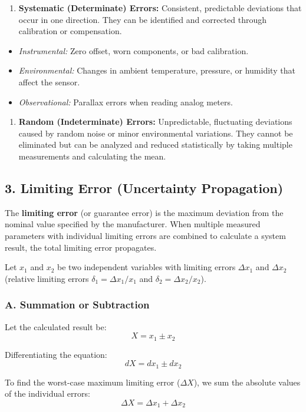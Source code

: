 \begin{enumerate}
  \item \textbf{Systematic (Determinate) Errors:} Consistent, predictable deviations that occur in one direction. They can be identified and corrected through calibration or compensation.
\end{enumerate}
\begin{itemize}
  \item \textit{Instrumental:} Zero offset, worn components, or bad calibration.
  \item \textit{Environmental:} Changes in ambient temperature, pressure, or humidity that affect the sensor.
  \item \textit{Observational:} Parallax errors when reading analog meters.
\end{itemize}
\begin{enumerate}
  \item \textbf{Random (Indeterminate) Errors:} Unpredictable, fluctuating deviations caused by random noise or minor environmental variations. They cannot be eliminated but can be analyzed and reduced statistically by taking multiple measurements and calculating the mean.
\end{enumerate}


\subsection{3. Limiting Error (Uncertainty Propagation)}
The \textbf{limiting error} (or guarantee error) is the maximum deviation from the nominal value specified by the manufacturer. When multiple measured parameters with individual limiting errors are combined to calculate a system result, the total limiting error propagates.

Let $x_1$ and $x_2$ be two independent variables with limiting errors $\Delta x_1$ and $\Delta x_2$ (relative limiting errors $\delta_1 = \Delta x_1 / x_1$ and $\delta_2 = \Delta x_2 / x_2$).

\subsubsection{A. Summation or Subtraction}
Let the calculated result be:
\[ X = x_1 \pm x_2 \]

Differentiating the equation:
\[ dX = dx_1 \pm dx_2 \]

To find the worst-case maximum limiting error ($\Delta X$), we sum the absolute values of the individual errors:
\[ \Delta X = \Delta x_1 + \Delta x_2 \]

